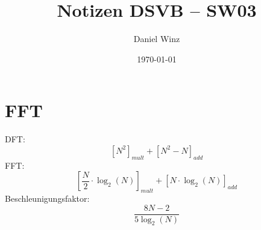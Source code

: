 \documentclass[a4,paper,fleqn]{article}
\title{Notizen DSVB -- SW03}
\date{\today}
\author{Daniel Winz}
\begin{document}
\maketitle
\clearpage

\section{FFT}
DFT: 
\[ [N^2]_{mult} + [N^2 - N] _{add} \]
FFT: 
\[ [\frac{N}{2} \cdot \log_2(N)]_{mult} + [N \cdot \log_2(N)] _{add} \]
Beschleunigungsfaktor: 
\[ \frac{8 N - 2}{5 \log_2(N)} \]
\end{document}
